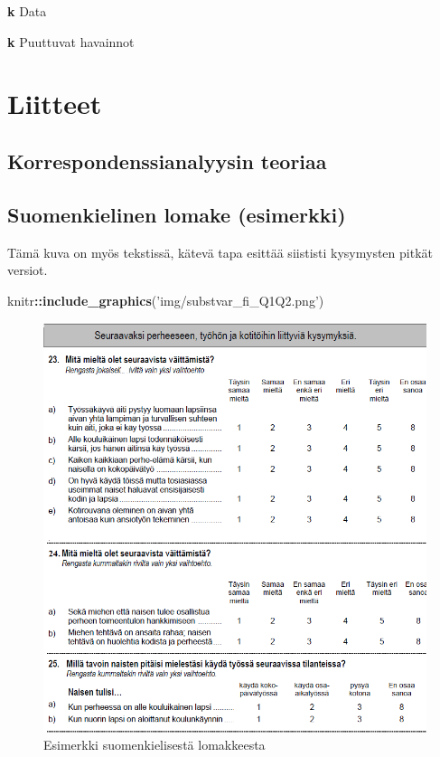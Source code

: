 \documentclass[
  finnish,
]{book}
\newenvironment{Shaded}{\begin{snugshade}}{\end{snugshade}}
\newcommand{\KeywordTok}[1]{\textcolor[rgb]{0.13,0.29,0.53}{\textbf{#1}}}
\newcommand{\NormalTok}[1]{#1}
\newcommand{\OperatorTok}[1]{\textcolor[rgb]{0.81,0.36,0.00}{\textbf{#1}}}
\newcommand{\StringTok}[1]{\textcolor[rgb]{0.31,0.60,0.02}{#1}}
\begin{document}
\textbf{k} Data

\textbf{k} Puuttuvat havainnot

\hypertarget{liitteet}{%
\chapter*{Liitteet}\label{liitteet}}

\hypertarget{korrespondenssianalyysin-teoriaa}{%
\section{Korrespondenssianalyysin
teoriaa}\label{korrespondenssianalyysin-teoriaa}}

\hypertarget{suomenkielinen-lomake-esimerkki}{%
\section{Suomenkielinen lomake
(esimerkki)}\label{suomenkielinen-lomake-esimerkki}}

Tämä kuva on myös tekstissä, kätevä tapa esittää siististi kysymysten
pitkät versiot.

\begin{Shaded}
\begin{Highlighting}[]
\NormalTok{knitr}\OperatorTok{::}\KeywordTok{include_graphics}\NormalTok{(}\StringTok{'img/substvar_fi_Q1Q2.png'}\NormalTok{)}
\end{Highlighting}
\end{Shaded}

\begin{figure}

{\centering \includegraphics[width=0.6\linewidth]{img/substvar_fi_Q1Q2} 

}

\caption{Esimerkki suomenkielisestä lomakkeesta}\label{fig:L1suomlom1}
\end{figure}
\end{document}
